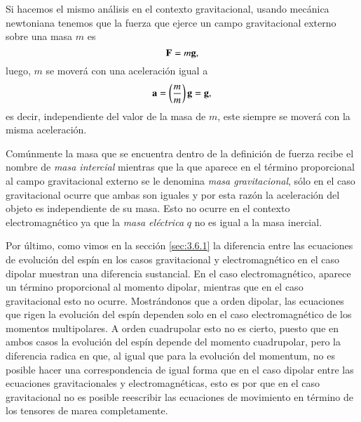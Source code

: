 Si hacemos el mismo análisis en el contexto gravitacional, usando mecánica newtoniana tenemos que la fuerza que ejerce un campo gravitacional externo sobre una masa $m$ es
\begin{equation}
\label{eq:67}
\vb{F} = m \vb{g},
\end{equation}
luego, $m$ se moverá con una aceleración igual a
\begin{equation}
\vb{a} = \left( \frac{m}{m} \right) \vb{g} = \vb{g},
\end{equation}
es decir, independiente del valor de la masa de $m$, este siempre se moverá con la misma aceleración. 

Comúnmente la masa que se encuentra dentro de la definición de fuerza recibe el nombre de \textit{masa intercial} mientras que la que aparece en el término proporcional al campo gravitacional externo se le denomina \textit{masa gravitacional}, sólo en el caso gravitacional ocurre que ambas son iguales y por esta razón la aceleración del objeto es independiente de su masa. Esto no ocurre en el contexto electromagnético ya que la \textit{masa eléctrica} $q$ no es igual a la masa inercial.

Por último, como vimos en la sección \ref{sec:3.6.1} la diferencia entre las ecuaciones de evolución del espín en los casos gravitacional y electromagnético en el caso dipolar muestran una diferencia sustancial. En el caso electromagnético, aparece un término proporcional al momento dipolar, mientras que en el caso gravitacional esto no ocurre. Mostrándonos que a orden dipolar, las ecuaciones que rigen la evolución del espín dependen solo en el caso electromagnético de los momentos multipolares. A orden cuadrupolar esto no es cierto, puesto que en ambos casos la evolución del espín depende del momento cuadrupolar, pero la diferencia radica en que, al igual que para la evolución del momentum, no es posible hacer una correspondencia de igual forma que en el caso dipolar entre las ecuaciones gravitacionales y electromagnéticas, esto es por que en el caso gravitacional no es posible reescribir las ecuaciones de movimiento en término de los tensores de marea completamente.